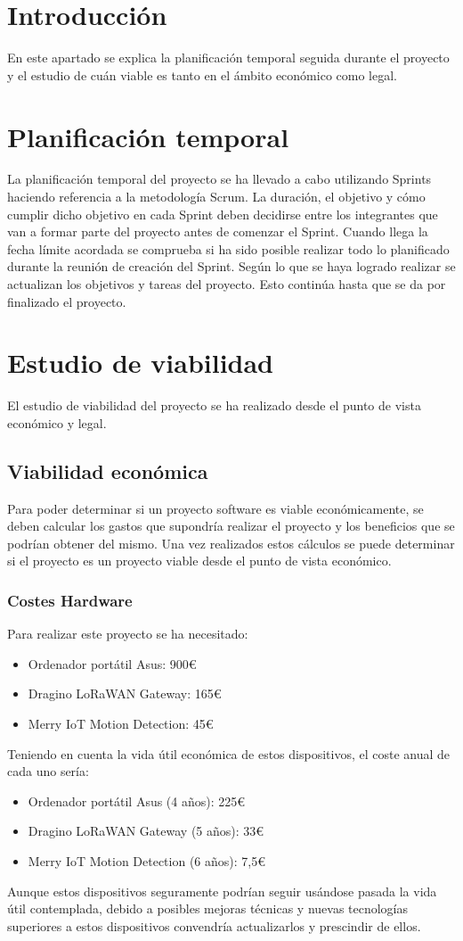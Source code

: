 
\section{Introducción}
En este apartado se explica la planificación temporal seguida durante el proyecto y el estudio de cuán viable es tanto en el ámbito económico como legal.
	
\section{Planificación temporal}
La planificación temporal del proyecto se ha llevado a cabo utilizando Sprints haciendo referencia a la metodología Scrum. La duración, el objetivo y cómo cumplir dicho objetivo en cada Sprint deben decidirse entre los integrantes que van a formar parte del proyecto antes de comenzar el Sprint.
Cuando llega la fecha límite acordada se comprueba si ha sido posible realizar todo lo planificado durante la reunión de creación del Sprint. Según lo que se haya logrado realizar se actualizan los objetivos y tareas del proyecto. Esto continúa hasta que se da por finalizado el proyecto.
\section{Estudio de viabilidad}
El estudio de viabilidad del proyecto se ha realizado desde el punto de vista económico y legal.
\subsection{Viabilidad económica}
Para poder determinar si un proyecto software es viable económicamente, se deben calcular los gastos que supondría realizar el proyecto y los beneficios que se podrían obtener del mismo. Una vez realizados estos cálculos se puede determinar si el proyecto es un proyecto viable desde el punto de vista económico.
\subsubsection{Costes Hardware}
Para realizar este proyecto se ha necesitado:
\begin{itemize}
    \item Ordenador portátil Asus: 900€
    \item Dragino LoRaWAN Gateway: 165€
    \item Merry IoT Motion Detection: 45€
\end{itemize}
Teniendo en cuenta la vida útil económica de estos dispositivos, el coste anual de cada uno sería:
\begin{itemize}
    \item Ordenador portátil Asus (4 años): 225€
    \item Dragino LoRaWAN Gateway (5 años): 33€
    \item Merry IoT Motion Detection (6 años): 7,5€
\end{itemize}
Aunque estos dispositivos seguramente podrían seguir usándose pasada la vida útil contemplada, debido a posibles mejoras técnicas y  nuevas tecnologías superiores a estos dispositivos convendría actualizarlos y prescindir de ellos. 
